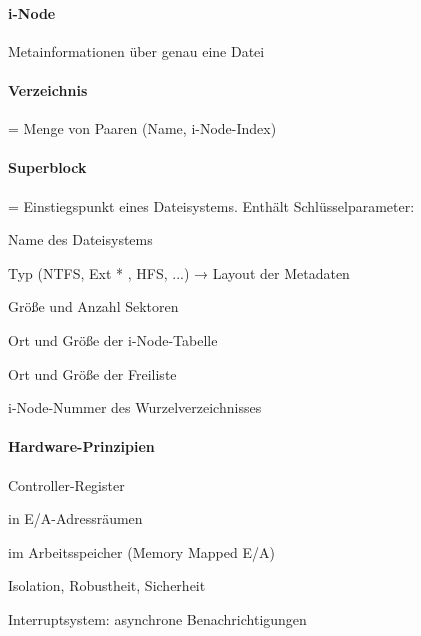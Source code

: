 \documentclass[a4paper]{article}
\begin{document}
\begin{multicols}{3}
  \paragraph{i-Node}
  Metainformationen über genau eine Datei

  \paragraph{Verzeichnis}
  = Menge von Paaren (Name, i-Node-Index)

  \paragraph{Superblock} = Einstiegspunkt eines Dateisystems. Enthält Schlüsselparameter:
  \begin{itemize*}
    \item Name des Dateisystems
    \item Typ (NTFS, Ext * , HFS, ...) → Layout der Metadaten
    \item Größe und Anzahl Sektoren
    \item Ort und Größe der i-Node-Tabelle
    \item Ort und Größe der Freiliste
    \item i-Node-Nummer des Wurzelverzeichnisses
  \end{itemize*}

  \paragraph{Hardware-Prinzipien}
  \begin{itemize*}
    \item Controller-Register
    \begin{itemize*}
      \item in E/A-Adressräumen
      \item im Arbeitsspeicher (Memory Mapped E/A)
      \item Isolation, Robustheit, Sicherheit
    \end{itemize*}
    \item Interruptsystem: asynchrone Benachrichtigungen
  \end{itemize*}


\end{multicols}
\end{document}

